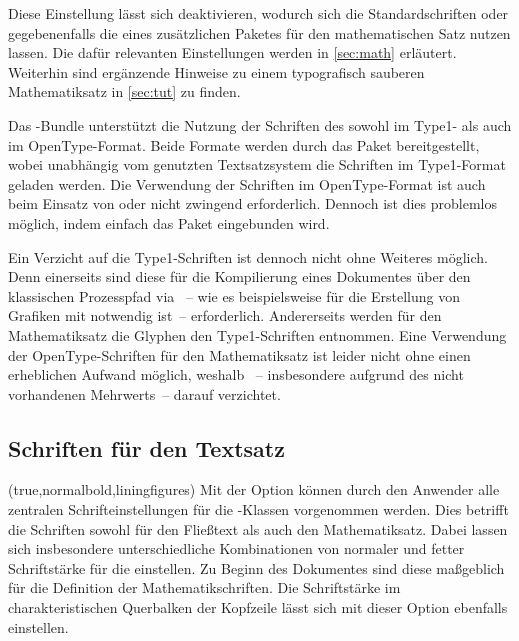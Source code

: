 \begin{DeclareEntity*}{}
\begin{DeclareEntity*}{}
\begin{DeclareEntity*}{}
Diese Einstellung lässt sich deaktivieren, wodurch sich die Standardschriften 
oder gegebenenfalls die eines zusätzlichen Paketes für den mathematischen Satz 
nutzen lassen. Die dafür relevanten Einstellungen werden in \autoref{sec:math} 
erläutert. Weiterhin sind ergänzende Hinweise zu einem typografisch sauberen
Mathematiksatz in \autoref{sec:tut} zu finden.


Das \TUDScript-Bundle unterstützt die Nutzung der Schriften des \CDs sowohl 
im Type1- als auch im OpenType-Format. Beide Formate werden durch das Paket 
 bereitgestellt, wobei unabhängig vom genutzten 
Textsatzsystem die Schriften im Type1-Format geladen werden. Die Verwendung der 
Schriften im OpenType-Format ist auch beim Einsatz von  oder 
 nicht zwingend erforderlich. Dennoch ist dies problemlos 
möglich, indem einfach das Paket  eingebunden wird.

Ein Verzicht auf die Type1-Schriften ist dennoch nicht ohne Weiteres möglich. 
Denn einerseits sind diese für die Kompilierung eines Dokumentes über den 
klassischen Prozesspfad via ~-- wie es 
beispielsweise für die Erstellung von Grafiken mit  notwendig 
ist~-- erforderlich. Andererseits werden für den Mathematiksatz die Glyphen den 
Type1-Schriften entnommen. Eine Verwendung der OpenType-Schriften für den 
Mathematiksatz ist leider nicht ohne einen erheblichen Aufwand möglich, weshalb 
\TUDScript~-- insbesondere aufgrund des nicht vorhandenen Mehrwerts~-- darauf 
verzichtet.%
%



\subsection{%
  Schriften für den Textsatz%
  \label{sec:text}%
}
%
\begin{Declaration}
  {}
  (true,normalbold,liningfigures)
\printdeclarationlist
%
Mit der Option  können durch den Anwender alle zentralen 
Schrifteinstellungen für die \TUDScript-Klassen vorgenommen werden. Dies 
betrifft die Schriften sowohl für den Fließtext als auch den Mathematiksatz.
Dabei lassen sich insbesondere unterschiedliche Kombinationen von normaler und 
fetter Schriftstärke für die \OpenSans einstellen. Zu Beginn des Dokumentes 
sind diese maßgeblich für die Definition der Mathematikschriften. Die 
Schriftstärke im charakteristischen Querbalken der Kopfzeile lässt sich mit 
dieser Option ebenfalls einstellen.


\end{Declaration}
\end{DeclareEntity*}
\end{DeclareEntity*}
\end{DeclareEntity*}

